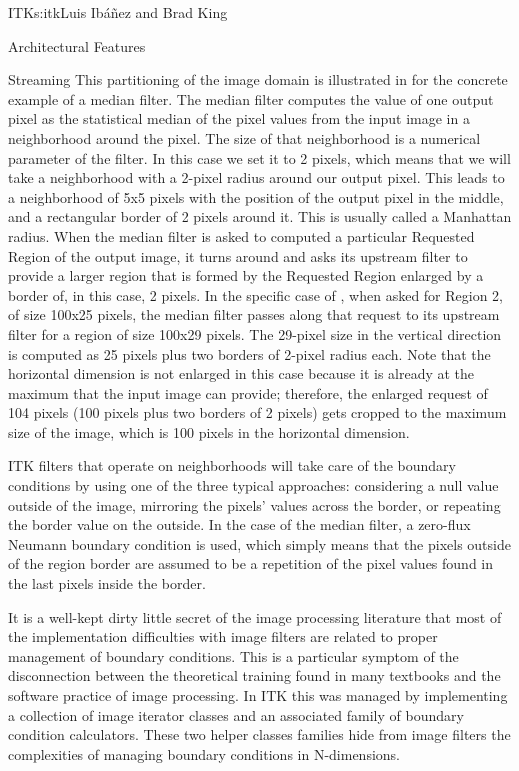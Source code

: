 \begin{aosachapter}{ITK}{s:itk}{Luis Ib\'{a}\~{n}ez and Brad King}
\begin{aosasect1}{Architectural Features}
\begin{aosasect2}{Streaming}
This partitioning of the image domain is illustrated in
 for the concrete example of a median filter. The
median filter computes the value of one output pixel as the statistical median
of the pixel values from the input image in a neighborhood around the
pixel. The size of that neighborhood is a numerical
parameter of the filter. In this case we set it to 2 pixels, which means
that we will take a neighborhood with a 2-pixel radius around our
output pixel. This leads to a neighborhood of 5x5 pixels with the
position of the output pixel in the middle, and a rectangular border of 2
pixels around it. This is usually called a Manhattan radius. When the median
filter is asked to computed a particular Requested Region of the
output image, it turns around and asks its upstream filter to provide a
larger region that is formed by the Requested Region enlarged by a
border of, in this case, 2 pixels.
In the specific case of , when asked
for Region 2, of size 100x25 pixels, the median filter passes along
that request to its upstream filter for a region of size 100x29 pixels. The 29-pixel 
size in the vertical direction is computed as 25 pixels plus two borders
of 2-pixel radius each. Note that the horizontal dimension is not enlarged in
this case because it is already at the maximum that the input image can
provide; therefore, the enlarged request of 104 pixels (100
pixels plus two borders of 2 pixels) gets cropped to the maximum size of
the image, which is 100 pixels in the horizontal dimension.

ITK filters that operate on neighborhoods will take care of the boundary
conditions by using one of the three typical approaches: considering a null
value outside of the image, mirroring the pixels' values across the border, or
repeating the border value on the outside. In the case of the median filter, a
zero-flux Neumann boundary condition is used, which simply means that the
pixels outside of the region border are assumed to be a repetition of the pixel
values found in the last pixels inside the border. 

It is a well-kept dirty little
secret of the image processing literature that most of the implementation
difficulties with image filters are related to proper management of boundary
conditions. This is a particular symptom of the disconnection between the
theoretical training found in many textbooks and the software practice of image
processing.  In ITK this was managed by implementing a collection of image
iterator classes and an associated family of boundary condition calculators.
These two helper classes families hide from image filters the
complexities of managing boundary conditions in N-dimensions.


\end{aosasect2}
\end{aosasect1}
\end{aosachapter}
